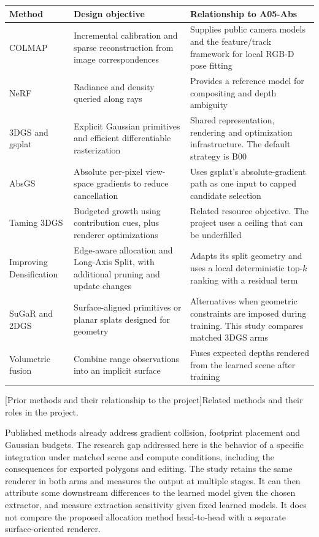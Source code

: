 \begin{center}\begin{minipage}{\linewidth}
\small\begin{tabularx}{\linewidth}{@{}>{\raggedright\arraybackslash}p{.20\linewidth}YY@{}}
\toprule
\textbf{Method} & \textbf{Design objective} & \textbf{Relationship to A05-Abs}\\
\midrule
COLMAP \cite{ref1} & Incremental calibration and sparse reconstruction from image correspondences & Supplies public camera models and the feature/track framework for local RGB-D pose fitting\\
NeRF \cite{ref3} & Radiance and density queried along rays & Provides a reference model for compositing and depth ambiguity\\
3DGS and gsplat \cite{ref4,ref5} & Explicit Gaussian primitives and efficient differentiable rasterization & Shared representation, rendering and optimization infrastructure. The default strategy is B00\\
AbsGS \cite{ref6} & Absolute per-pixel view-space gradients to reduce cancellation & Uses gsplat's absolute-gradient path as one input to capped candidate selection\\
Taming 3DGS \cite{ref12} & Budgeted growth using contribution cues, plus renderer optimizations & Related resource objective. The project uses a ceiling that can be underfilled\\
Improving Densification \cite{ref7} & Edge-aware allocation and Long-Axis Split, with additional pruning and update changes & Adapts its split geometry and uses a local deterministic top-$k$ ranking with a residual term\\
SuGaR and 2DGS \cite{ref8,ref13} & Surface-aligned primitives or planar splats designed for geometry & Alternatives when geometric constraints are imposed during training. This study compares matched 3DGS arms\\
Volumetric fusion \cite{ref9} & Combine range observations into an implicit surface & Fuses expected depths rendered from the learned scene after training\\
\bottomrule
\end{tabularx}\par
{}[Prior methods and their relationship to the project]{Related methods and their roles in the project.}\label{tab:related}
\end{minipage}\end{center}

Published methods already address gradient collision, footprint placement and Gaussian budgets. The research gap addressed here is the behavior of a specific integration under matched scene and compute conditions, including the consequences for exported polygons and editing. The study retains the same renderer in both arms and measures the output at multiple stages. It can then attribute some downstream differences to the learned model given the chosen extractor, and measure extraction sensitivity given fixed learned models. It does not compare the proposed allocation method head-to-head with a separate surface-oriented renderer.
